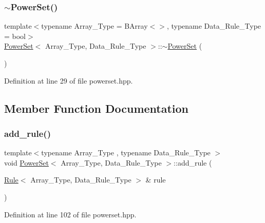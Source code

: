 \subsubsection{\texorpdfstring{$\sim$\+Power\+Set()}{~PowerSet()}}
{\footnotesize\ttfamily template$<$typename Array\+\_\+\+Type  = B\+Array$<$$>$, typename Data\+\_\+\+Rule\+\_\+\+Type  = bool$>$ \\
\hyperlink{class_power_set}{Power\+Set}$<$ Array\+\_\+\+Type, Data\+\_\+\+Rule\+\_\+\+Type $>$\+::$\sim$\hyperlink{class_power_set}{Power\+Set} (\begin{DoxyParamCaption}{ }\end{DoxyParamCaption})\hspace{0.3cm}{\ttfamily [inline]}}



Definition at line 29 of file powerset.\+hpp.



\subsection{Member Function Documentation}
\mbox{\label{class_power_set_a00ee318a40da91bcf0bff79bf71454ab}} 
\subsubsection{\texorpdfstring{add\+\_\+rule()}{add\_rule()}\hspace{0.1cm}{\footnotesize\ttfamily [1/3]}}
{\footnotesize\ttfamily template$<$typename Array\+\_\+\+Type , typename Data\+\_\+\+Rule\+\_\+\+Type $>$ \\
void \hyperlink{class_power_set}{Power\+Set}$<$ Array\+\_\+\+Type, Data\+\_\+\+Rule\+\_\+\+Type $>$\+::add\+\_\+rule (\begin{DoxyParamCaption}\item[{\hyperlink{class_rule}{Rule}$<$ Array\+\_\+\+Type, Data\+\_\+\+Rule\+\_\+\+Type $>$ \&}]{rule }\end{DoxyParamCaption})\hspace{0.3cm}{\ttfamily [inline]}}



Definition at line 102 of file powerset.\+hpp.

\mbox{\label{class_power_set_a6cb8fb8f09b4c190e2ac6c07daa1241e}} 
